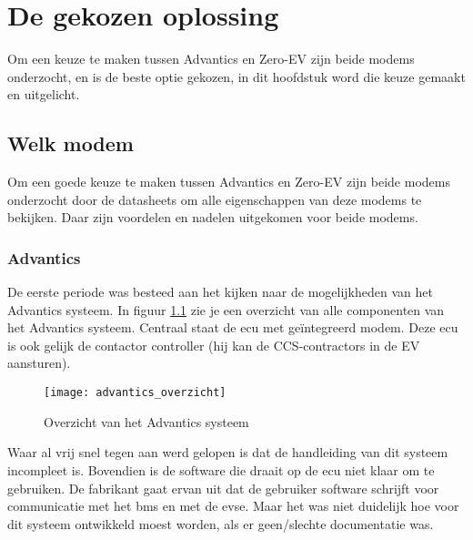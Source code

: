 \chapter{De gekozen oplossing}
\label{De_gekozen_oplossing}

Om een keuze te maken tussen Advantics en Zero-EV zijn beide modems onderzocht,
en is de beste optie gekozen, in dit hoofdstuk word die keuze gemaakt en
uitgelicht.

\section{Welk modem}

Om een goede keuze te maken tussen Advantics en Zero-EV zijn beide modems
onderzocht door de datasheets om alle eigenschappen van deze modems te
bekijken. Daar zijn voordelen en nadelen uitgekomen voor beide modems.

\subsection{Advantics}

De eerste periode was besteed aan het kijken naar de mogelijkheden van het
Advantics systeem. In figuur \ref{fig:advantics_overzicht} zie je een overzicht
van alle componenten van het Advantics systeem. Centraal staat de \ac{ecu} met
geïntegreerd modem. Deze \ac{ecu} is ook gelijk de contactor controller (hij
kan de CCS-contractors in de EV aansturen).

\begin{figure}[h]
    \centering
    \texttt{[image: advantics\_overzicht]}
    \caption{Overzicht van het Advantics systeem}
    \label{fig:advantics_overzicht}
\end{figure}

Waar al vrij snel tegen aan werd gelopen is dat de handleiding van dit systeem
incompleet is. Bovendien is de software die draait op de \ac{ecu} niet klaar om
te gebruiken. De fabrikant gaat ervan uit dat de gebruiker software schrijft
voor communicatie met het \ac{bms} en met de \ac{evse}. Maar het was niet
duidelijk hoe voor dit systeem ontwikkeld moest worden, als er geen/slechte
documentatie was.

